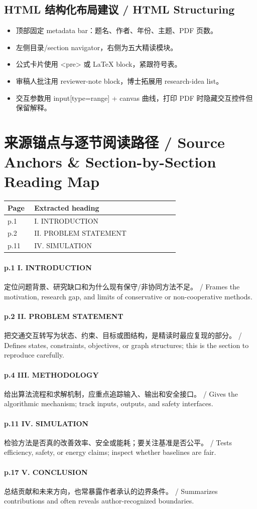 \documentclass[UTF8,a4paper,11pt,fontset=fandol]{ctexart}
\begin{document}
\subsection{HTML 结构化布局建议 / HTML Structuring}
\begin{itemize}
\item 顶部固定 metadata bar：题名、作者、年份、主题、PDF 页数。
\item 左侧目录/section navigator，右侧为五大精读模块。
\item 公式卡片使用 <pre> 或 LaTeX block，紧跟符号表。
\item 审稿人批注用 reviewer-note block，博士拓展用 research-idea list。
\item 交互参数用 input[type=range] + canvas 曲线，打印 PDF 时隐藏交互控件但保留解释。
\end{itemize}


\section{来源锚点与逐节阅读路径 / Source Anchors \& Section-by-Section Reading Map}
\begin{longtable}{p{0.14\linewidth}p{0.76\linewidth}}
\toprule
Page & Extracted heading\\
\midrule
p.1 & I. INTRODUCTION \\
p.2 & II. PROBLEM STATEMENT \\
p.11 & IV. SIMULATION \\
\bottomrule
\end{longtable}

\paragraph{p.1 I. INTRODUCTION}定位问题背景、研究缺口和为什么现有保守/非协同方法不足。 / Frames the motivation, research gap, and limits of conservative or non-cooperative methods.

\paragraph{p.2 II. PROBLEM STATEMENT}把交通交互转写为状态、约束、目标或图结构，是精读时最应复现的部分。 / Defines states, constraints, objectives, or graph structures; this is the section to reproduce carefully.

\paragraph{p.4 III. METHODOLOGY}给出算法流程和求解机制，应重点追踪输入、输出和安全接口。 / Gives the algorithmic mechanism; track inputs, outputs, and safety interfaces.

\paragraph{p.11 IV. SIMULATION}检验方法是否真的改善效率、安全或能耗；要关注基准是否公平。 / Tests efficiency, safety, or energy claims; inspect whether baselines are fair.

\paragraph{p.17 V. CONCLUSION}总结贡献和未来方向，也常暴露作者承认的边界条件。 / Summarizes contributions and often reveals author-recognized boundaries.
\end{document}
